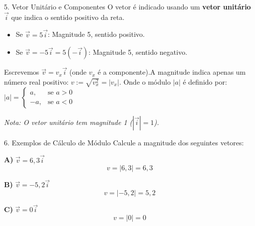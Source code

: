 \documentclass{beamer}
\begin{document}
		
\begin{frame}{5. Vetor Unitário e Componentes}
	O vetor é indicado usando um \textbf{vetor unitário} $\vec{i}$ que indica o sentido positivo da reta.
	\begin{center}
	\end{center}
	
	\begin{itemize}
		\item Se $\vec{v} = 5 \vec{i}$: Magnitude 5, sentido positivo.
		\item Se $\vec{v} = -5 \vec{i} = 5(-\vec{i})$: Magnitude 5, sentido negativo.
	\end{itemize}
	
	\vspace{0.2cm}
	Escrevemos $\vec{v} = v_x \vec{i}$ (onde $v_x$ é a componente).A magnitude indica apenas um número real positivo: $ v := \sqrt{v_x^2} = |v_x| $. Onde o módulo $|a|$ é definido por:$ |a| = \begin{cases} a, & \text{se } a > 0 \\ -a, & \text{se } a < 0 \end{cases} $
	
	\vspace{0.2cm}
	\footnotesize{\textit{Nota: O vetor unitário tem magnitude 1 ($|\vec{i}| = 1$).}}
\end{frame}

	\begin{frame}{6. Exemplos de Cálculo de Módulo}
		Calcule a magnitude dos seguintes vetores:
		
		\vspace{0.5cm}
		\textbf{A)} $\vec{v} = 6,3 \vec{i}$
		$$ v = |6,3| = 6,3 $$
		
		\textbf{B)} $\vec{v} = -5,2 \vec{i}$
		$$ v = |-5,2| = 5,2 $$
		
		\textbf{C)} $\vec{v} = 0 \vec{i}$
		$$ v = |0| = 0 $$
	\end{frame}
	
\end{document}
